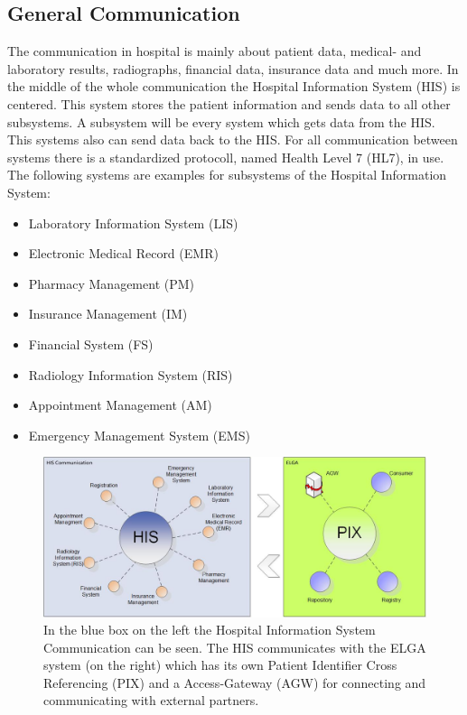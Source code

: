 \documentclass[a4paper]{article}
\begin{document}
	\subsection{General Communication}
		The communication in hospital is mainly about patient data,
		medical- and laboratory results, radiographs, financial data, insurance
		data and much more. In the middle of the whole communication the
		Hospital Information System (HIS) is centered. This system stores the patient
		information and sends data to all other subsystems. A subsystem
		will be every system which gets data from the HIS. This systems also can send
		data back to the HIS. For all communication between systems there is a
		standardized protocoll, named Health Level 7 (HL7), in use.\\
		The following systems are examples for subsystems of the Hospital
		Information System:
		\begin{itemize}
	    	\item Laboratory Information System (LIS)
	    	\item Electronic Medical Record (EMR)
	    	\item Pharmacy Management (PM)
	    	\item Insurance Management (IM)
	    	\item Financial System (FS)
	    	\item Radiology Information System (RIS)
	    	\item Appointment Management (AM)
	    	\item Emergency Management System (EMS)
	    \end{itemize}
	    \begin{figure}[!ht]
		  \centering
		      \includegraphics[width=1.0\textwidth]{HIS_Overview}
		  \caption{In the blue box on the left the Hospital Information System
		  Communication can be seen. The HIS  communicates with the ELGA system
		  (on the right) which has its own Patient Identifier Cross Referencing
		  (PIX) and a Access-Gateway (AGW) for connecting and communicating with
		  external partners.}
		\end{figure}
\end{document}
